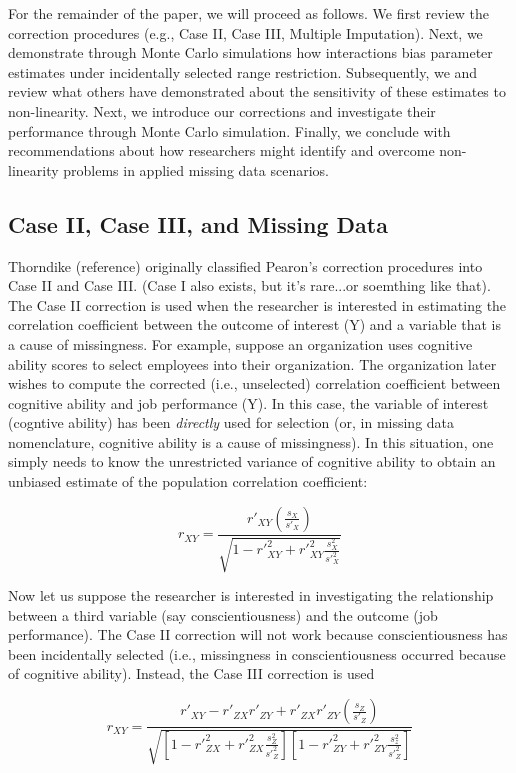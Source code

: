 \documentclass[man, babel,english]{apa}%
\begin{document}
For the remainder of the paper, we will proceed as follows. We first review the correction procedures (e.g., Case II, Case III, Multiple Imputation). Next, we demonstrate through Monte Carlo simulations how interactions bias parameter estimates under incidentally selected range restriction. Subsequently, we and review what others have demonstrated about the sensitivity of these estimates to non-linearity. Next, we introduce our corrections and investigate their performance through Monte Carlo simulation. Finally, we conclude with recommendations about how researchers might identify and overcome non-linearity problems in applied missing data scenarios. 

\subsection{Case II, Case III, and Missing Data}
Thorndike (reference) originally classified Pearon's correction procedures into Case II and Case III. (Case I also exists, but it's rare...or soemthing like that). The Case II correction is used when the researcher is interested in estimating the correlation coefficient between the outcome of interest (Y) and a variable that is a cause of missingness. For example, suppose an organization uses cognitive ability scores to select employees into their organization. The organization later wishes to compute the corrected (i.e., unselected) correlation coefficient between cognitive ability and job performance (Y). In this case, the variable of interest (cogntive ability) has been \emph{directly} used for selection (or, in missing data nomenclature, cognitive ability is a cause of missingness). In this situation, one simply needs to know the unrestricted variance of cognitive ability to obtain an unbiased estimate of the population correlation coefficient:

\begin{equation}
\label{eq:II}
r_{XY} = \frac{r'_{XY}(\frac{s_X}{s'_X})}{\sqrt{1-r'^2_{XY} + r'^2_{XY}\frac{s^2_X}{s'^2_X}}}
\end{equation}

Now let us suppose the researcher is interested in investigating the relationship between a third variable (say conscientiousness) and the outcome (job performance). The Case II correction will not work because conscientiousness has been incidentally selected (i.e., missingness in conscientiousness occurred because of cognitive ability). Instead, the Case III correction is used 

\begin{equation}
\label{eq:III}
r_{XY} = \frac{r'_{XY}-r'_{ZX}r'_{ZY} + r'_{ZX}r'_{ZY}(\frac{s_Z}{s'_Z})}{\sqrt{[1-r'^2_{ZX} + r'^2_{ZX}\frac{s^2_Z}{s'^2_Z}][1-r'^2_{ZY} + r'^2_{ZY}\frac{s^2_z}{s'^2_Z}]}}
\end{equation}
\end{document}
